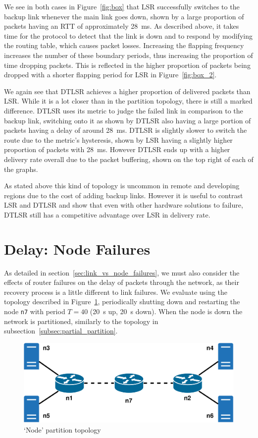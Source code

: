 \documentclass[withindex,glossary,openany]{cam-thesis}
\begin{document}
We see in both cases in Figure~\ref{fig:box} that LSR successfully switches to the backup link whenever the main link goes down, shown by a large proportion of packets having an RTT of approximately \SI{28}{\ms}. As described above, it takes time for the protocol to detect that the link is down and to respond by modifying the routing table, which causes packet losses. Increasing the flapping frequency increases the number of these boundary periods, thus increasing the proportion of time dropping packets. This is reflected in the higher proportion of packets being dropped with a shorter flapping period for LSR in Figure~\ref{fig:box_2}.

We again see that DTLSR achieves a higher proportion of delivered packets than LSR. While it is a lot closer than in the partition topology, there is still a marked difference. DTLSR uses its metric to judge the failed link in comparison to the backup link, switching onto it as shown by DTLSR also having a large portion of packets having a delay of around \SI{28}{\ms}. DTLSR is slightly slower to switch the route due to the metric's hysteresis, shown by LSR having a slightly higher proportion of packets with \SI{28}{\ms}. However DTLSR ends up with a higher delivery rate overall due to the packet buffering, shown on the top right of each of the graphs.

As stated above this kind of topology is uncommon in remote and developing regions due to the cost of adding backup links. However it is useful to contrast LSR and DTLSR and show that even with other hardware solutions to failure, DTLSR still has a competitive advantage over LSR in delivery rate.

\section{Delay: Node Failures}

As detailed in section~\ref{sec:link_vs_node_failures}, we must also consider the effects of router failures on the delay of packets through the network, as their recovery process is a little different to link failures. We evaluate using the topology described in Figure~\ref{fig:node_partition_topology}, periodically shutting down and restarting the node \texttt{n7} with period $T=40$ (\SI{20}{\s} up, \SI{20}{\s} down). When the node is down the network is partitioned, similarly to the topology in subsection~\ref{subsec:partial_partition}.

\begin{figure}[H]
  \centering
  \includegraphics[width=0.65\linewidth]{delay_full_partition_topology}
  \caption{`Node' partition topology}
  \label{fig:node_partition_topology}
\end{figure}
\end{document}
